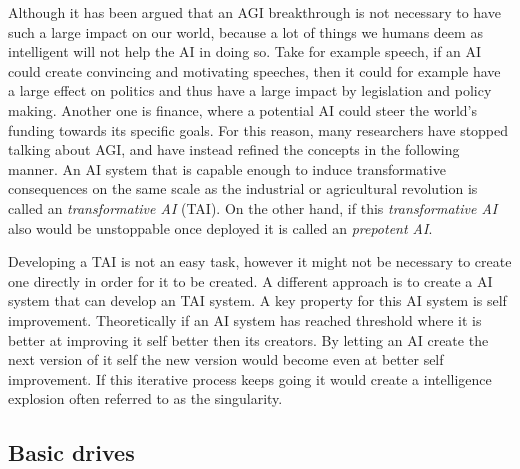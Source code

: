 \documentclass[12pt,A4]{report}
\theoremstyle{definition}
\begin{document}
Although it has been argued that an AGI breakthrough is not necessary to have such a large impact on our world, because a lot of things we humans deem as intelligent will not help the AI in doing so. Take for example speech, if an AI could create convincing and motivating speeches, then it could for example have a large effect on politics and thus have a large impact by legislation and policy making. Another one is finance, where a potential AI could steer the world's funding towards its specific goals. For this reason, many researchers have stopped talking about AGI, and have instead refined the concepts in the following manner\autocite{Critch Kruger}. An AI system that is capable enough to induce transformative consequences on the same scale as the industrial or agricultural revolution is called an \textit{transformative AI} (TAI). On the other hand, if this \textit{transformative AI} also would be unstoppable once deployed it is called an \textit{prepotent AI}. 

Developing a TAI is not an easy task, however it might not be necessary to create one directly in order for it to be created\autocite{Superintelligence}. A different approach is to create a AI system that can develop an TAI system. A key property for this AI system is self improvement. Theoretically if an AI system has reached threshold where it is better at improving it self better then its creators. By letting an AI create the next version of it self the new version would become even at better self improvement. If this iterative process keeps going it would create a intelligence explosion\autocite{Yudkowsky} often referred to as the singularity.  


\subsection{Basic drives}
\end{document}
